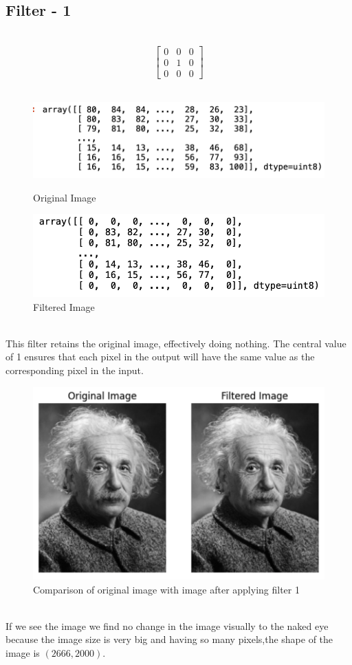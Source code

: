 \documentclass{assignment}
\begin{document}
\subsection{Filter - 1}
\\
\vspace{1.4 cm}
\[\begin{bmatrix} 0 & 0 & 0 \\ 0 & 1 & 0 \\ 0 & 0 & 0 \end{bmatrix}\]
\\
\vspace{2 cm}
\begin{figure}[h]
  \begin{minipage}{0.5\textwidth}
    \centering
    \includegraphics[width=0.8\linewidth]{image.png}
    \caption{Original Image}
    \label{fig:original_image}
  \end{minipage}%
  \begin{minipage}{0.5\textwidth}
    \centering
    \includegraphics[width=0.8\linewidth]{f1.png}
    \caption{Filtered Image}
    \label{fig:filtered_image}
  \end{minipage}
\end{figure}
\\
This filter retains the original image, effectively doing nothing. The central value of 1 ensures that each pixel in the output will have the same value as the corresponding pixel in the input.
\begin{figure}[h]
    \centering
    \includegraphics[width=0.4\linewidth]{magic.png}
    \caption{Comparison of original image with image after applying filter 1}
    \label{fig:enter-label}
\end{figure}
\\
If we see the image we  find no change in the image visually to the naked eye because the image size is very big and having so many pixels,the shape of the image is \((2666, 2000)\).
\end{document}
